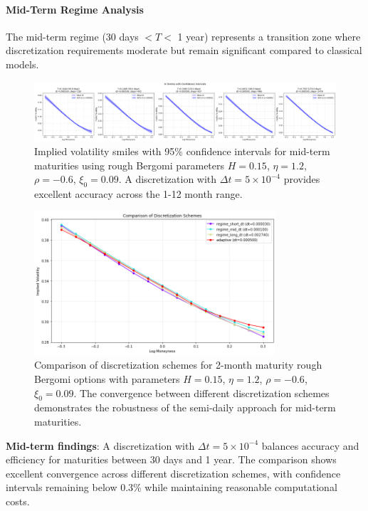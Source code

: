 	\paragraph{Mid-Term Regime Analysis}
	
	The mid-term regime (30 days $< T <$ 1 year) represents a transition zone where discretization requirements moderate but remain significant compared to classical models.
	
	\begin{figure}[ht]
		\centering
		\includegraphics[width=\textwidth]{../images/mid_regime_discretization_confidence.png}
		\caption{Implied volatility smiles with 95\% confidence intervals for mid-term maturities using rough Bergomi parameters $H = 0.15$, $\eta = 1.2$, $\rho = -0.6$, $\xi_0 = 0.09$. A discretization with $\Delta t = 5\times 10^{-4}$ provides excellent accuracy across the 1-12 month range.}
		\label{fig:discretization-mid}
	\end{figure}
	
	\begin{figure}[ht]
		\centering
		\includegraphics[width=0.8\textwidth]{../images/mid_regime_discretization_schemes.png}
		\caption{Comparison of discretization schemes for 2-month maturity rough Bergomi options with parameters $H = 0.15$, $\eta = 1.2$, $\rho = -0.6$, $\xi_0 = 0.09$. The convergence between different discretization schemes demonstrates the robustness of the semi-daily approach for mid-term maturities.}
		\label{fig:discretization-schemes-mid}
	\end{figure}
	
	\textbf{Mid-term findings}: A discretization with $\Delta t = 5\times 10^{-4}$ balances accuracy and efficiency for maturities between 30 days and 1 year. The comparison shows excellent convergence across different discretization schemes, with confidence intervals remaining below 0.3\% while maintaining reasonable computational costs.
	
